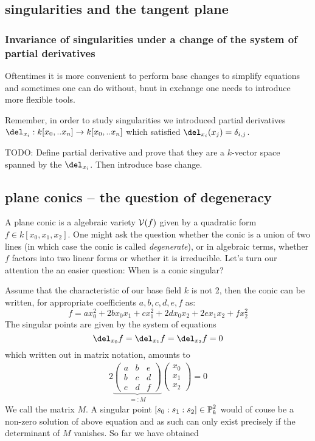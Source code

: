 \subsection{singularities and the tangent plane}



\subsubsection{Invariance of singularities under a change of the system of partial derivatives}

Oftentimes it is more convenient to perform base changes to simplify equations and sometimes one can do without, bnut in exchange one needs to introduce more flexible tools.

Remember, in order to study singularities we introduced partial derivatives $\del_{x_i} : k[x_0,..x_n] \to k[x_0,..x_n]$ which satisfied $\del_{x_i}(x_j) = \delta_{i,j}$.

TODO: Define partial derivative and prove that they are a $k$-vector space spanned by the $\del_{x_i}$.
Then introduce base change.


\subsection{plane conics -- the question of degeneracy}

A plane conic is a algebraic variety $\operatorname{\mathcal V}(f)$ given by a quadratic form $f \in k[x_0,x_1,x_2]$. One might ask the question whether the conic is a union of two lines (in which case the conic is called \emph{degenerate}), or in algebraic terms, whether $f$ factors into two linear forms or whether it is irreducible.
Let's turn our attention the an easier question: When is a conic singular?

Assume that the characteristic of our base field $k$ is not 2, then the conic can be written, for appropriate coefficients $a,b,c,d,e,f$ as:
\begin{equation}
f = ax_0^2 + 2bx_0x_1 + cx_1^2 + 2dx_0x_2 + 2ex_1x_2 + fx_2^2
\end{equation}
The singular points are given by the system of equations
\begin{equation}
\del_{x_0} f = \del_{x_1} f = \del_{x_2} f = 0
\end{equation}
which written out in matrix notation, amounts to
\begin{align}
2
\underset{=:M}{\underbrace{
\begin{pmatrix}
a & b & e \\
b & c & d \\
e & d & f
\end{pmatrix}
}}
\begin{pmatrix}
x_0 \\ x_1 \\ x_2
\end{pmatrix}
=
0
\end{align}
We call the matrix $M$.
A singular point $[s_0:s_1:s_2] \in \operatorname{\mathbb P}^2_k$ would of couse be a non-zero solution of above equation and as such can only exist precisely if the determinant of $M$ vanishes.
So far we have obtained

